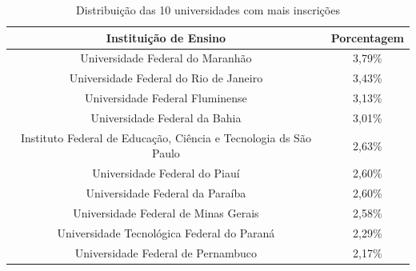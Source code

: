                 \begin{table}[]
                    \centering
                    \begin{tabular}{cc}
                    \hline
                    \textbf{Instituição de Ensino}                                   & \textbf{Porcentagem} \\ \hline
                    Universidade Federal do Maranhão                                 & 3,79\%               \\ \hline
                    Universidade Federal do Rio de Janeiro                           & 3,43\%               \\ \hline
                    Universidade Federal Fluminense                                  & 3,13\%               \\ \hline
                    Universidade Federal da Bahia                                    & 3,01\%               \\ \hline
                    Instituto Federal de Educação, Ciência e Tecnologia ds São Paulo & 2,63\%               \\ \hline
                    Universidade Federal do Piauí                                    & 2,60\%               \\ \hline
                    Universidade Federal da Paraíba                                  & 2,60\%               \\ \hline
                    Universidade Federal de Minas Gerais                             & 2,58\%               \\ \hline
                    Universidade Tecnológica Federal do Paraná                       & 2,29\%               \\ \hline
                    Universidade Federal de Pernambuco                               & 2,17\%               \\ \hline
                    \end{tabular}
                    \caption{Distribuição das 10 universidades com mais inscrições}
                    \label{tab:universidade-inscricao}
                    \end{table}

